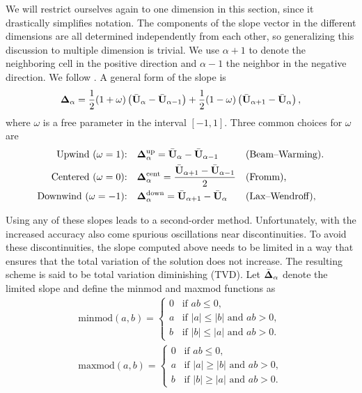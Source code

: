 \documentclass{article}
\begin{document}
We will restrict ourselves again to one dimension in this section, since it drastically simplifies
notation. The components of the slope vector in the different dimensions are all determined
independently from each other, so generalizing this discussion to multiple dimension is trivial.
We use $\alpha+1$ to denote the neighboring cell in the positive direction and $\alpha-1$ the
neighbor in the negative direction. We follow \cite[\S6]{leveque}. A general form of the slope is
\begin{align}
  \label{eq:slope_vector}
  \mathrm{\bf \Delta}_\alpha =
      \frac{1}{2}(1+\omega) \left(\bar{\mathrm{\bf U}}_{\alpha} - \bar{\mathrm{\bf U}}_{\alpha-1}\right)
    + \frac{1}{2}(1-\omega) \left(\bar{\mathrm{\bf U}}_{\alpha+1} - \bar{\mathrm{\bf U}}_{\alpha}\right),
\end{align}
where $\omega$ is a free parameter in the interval $[-1,1]$. Three common choices for $\omega$ are
\begin{align}
  \label{eq:example_slopes}
  \text{Upwind ($\omega = 1$):} \quad
    & \mathrm{\bf \Delta}_\alpha^\text{up} = \bar{\mathrm{\bf U}}_{\alpha} - \bar{\mathrm{\bf U}}_{\alpha-1} &
    & \text{(Beam--Warming).}  \\
  \text{Centered ($\omega = 0$):} \quad
    & \mathrm{\bf \Delta}_\alpha^\text{cent} = \frac{\bar{\mathrm{\bf U}}_{\alpha+1} - \bar{\mathrm{\bf U}}_{\alpha-1}}{2} &
    & \text{(Fromm),}  \\
  \text{Downwind ($\omega = -1$):} \quad
    & \mathrm{\bf \Delta}_\alpha^\text{down} = \bar{\mathrm{\bf U}}_{\alpha+1} - \bar{\mathrm{\bf U}}_{\alpha} &
    & \text{(Lax--Wendroff),}
\end{align}

Using any of these slopes leads to a second-order method. Unfortunately, with the increased accuracy
also come spurious oscillations near discontinuities. To avoid these discontinuities, the slope
computed above needs to be limited in a way that ensures that the total variation of the solution
does not increase. The resulting scheme is said to be total variation diminishing (TVD). Let
$\bar{\mathrm{\bf \Delta}}_\alpha$ denote the limited slope and define the minmod and maxmod functions as
\begin{align}
  \label{eq:minmod-maxmod}
  \text{minmod}(a,b) = \left\{
    \begin{array}{ll}
      0 & \text{if } ab \leq 0, \\
      a & \text{if } |a| \leq |b| \text{ and } ab > 0, \\
      b & \text{if } |b| \leq |a| \text{ and } ab > 0.
    \end{array}\right. \\[6pt]
    \text{maxmod}(a,b) = \left\{
    \begin{array}{ll}
      0 & \text{if } ab \leq 0, \\
      a & \text{if } |a| \geq |b| \text{ and } ab > 0, \\
      b & \text{if } |b| \geq |a| \text{ and } ab > 0.
    \end{array}\right.
\end{align}
\end{document}
